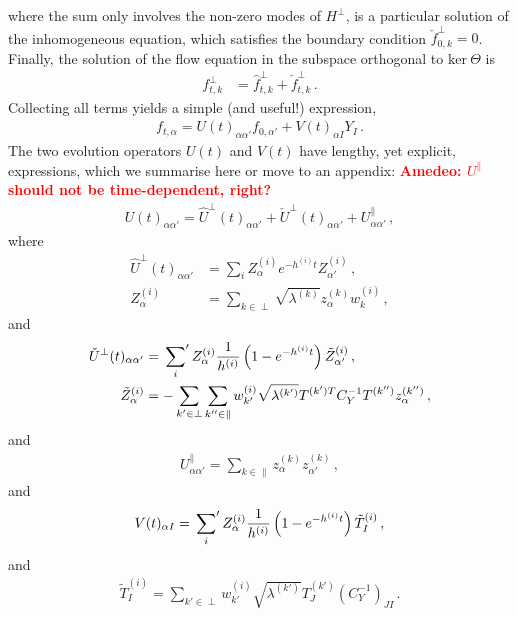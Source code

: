 \documentclass[11pt]{article}
\newcommand{\ac}[1]{\textcolor{red}{\textbf{Amedeo: #1}}}
\begin{document}
where the sum only involves the non-zero modes of $H^\perp$,
is a particular solution of the inhomogeneous equation, which satisfies the boundary
condition $\check{f}^{\perp}_{0,k}=0$. Finally, the solution of the flow equation in the subspace orthogonal to
$\text{ker}\ \Theta$ is
\begin{align}
    f^\perp_{t,k}
    \label{eq:FlowSolution}
        &= \hat{f}^\perp_{t,k} + \check{f}^\perp_{t,k}
        \, .
\end{align}
Collecting all terms yields a simple (and useful!) expression,
\begin{align}
    \label{eq:AnalyticSol}
    f_{t,\alpha}
        = U(t)_{\alpha\alpha'} f_{0,\alpha'} + V(t)_{\alpha I} Y_{I}\, .
\end{align}
The two evolution operators $U(t)$ and $V(t)$ have lengthy, yet explicit, expressions, which we
summarise here or move to an appendix: \ac{$U^\parallel$ should not be time-dependent, right?}
\begin{align}
    U(t)_{\alpha\alpha'} = \hat{U}^\perp(t)_{\alpha\alpha'}
        + \check{U}^\perp(t)_{\alpha\alpha'} + U^\parallel_{\alpha\alpha'}\, ,
\end{align}
where
\begin{align}
    \hat{U}^\perp(t)_{\alpha\alpha'}
        &= \sum_i Z^{(i)}_{\alpha} e^{-h^{(i)}t} Z^{(i)}_{\alpha'}\, , \\
    Z^{(i)}_{\alpha}
        &= \sum_{k\in\perp} \sqrt{\lambda^{(k)}} z^{(k)}_\alpha w^{(i)}_{k}\, ,
\end{align}
and
\begin{align}
    \check{U}^\perp(t)_{\alpha\alpha'}
        &= \sideset{}{'}\sum_{i} Z^{(i)}_{\alpha} \frac{1}{h^{(i)}} \left(1 - e^{-h^{(i)}t}\right) \tilde{Z}^{(i)}_{\alpha'}\, , \\
    \tilde{Z}^{(i)}_{\alpha}
        &= -\sum_{k'\in\perp} \sum_{k''\in\parallel} w^{(i)}_{k'} \sqrt{\lambda^{(k')}}
            T^{(k') T} C_Y^{-1} T^{(k'')} z^{(k'')}_{\alpha}\, ,
\end{align}
and
\begin{align}
    U^\parallel_{\alpha\alpha'}
        = \sum_{k\in\parallel} z^{(k)}_\alpha z^{(k)}_{\alpha'} \, ,
\end{align}
and
\begin{align}
    V(t)_{\alpha I} = \sideset{}{'}\sum_{i} Z^{(i)}_{\alpha} \frac{1}{h^{(i)}} \left(1 - e^{-h^{(i)}t}\right)
        \tilde{T}^{(i)}_{I}\, ,
\end{align}
and
\begin{align}
    \tilde{T}^{(i)}_{I} = \sum_{k'\in\perp} w^{(i)}_{k'} \sqrt{\lambda^{(k')}}
        T^{(k')}_J \left(C_Y^{-1}\right)_{JI}\, .
\end{align}
\end{document}
